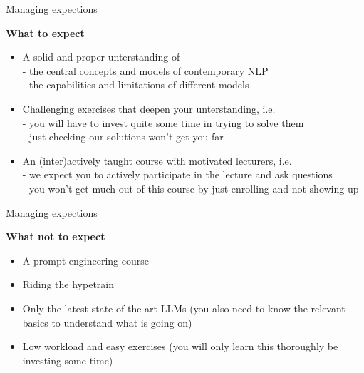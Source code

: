 \begin{vbframe}{Managing expections}

\vfill

\textbf{What to expect}

	\begin{itemize}
		\item A solid and proper unterstanding of\\
		- the central concepts and models of contemporary NLP\\
		- the capabilities and limitations of different models
		\item Challenging exercises that deepen your unterstanding, i.e.\\
		- you will have to invest quite some time in trying to solve them\\
		- just checking our solutions won't get you far
		\item An (inter)actively taught course with motivated lecturers, i.e.\\
		- we expect you to actively participate in the lecture and ask questions\\
		- you won't get much out of this course by just enrolling and not showing up
	\end{itemize}


\vfill

\end{vbframe}


\begin{vbframe}{Managing expections}

\vfill

\textbf{What not to expect}

	\begin{itemize}
		\item A prompt engineering course
		\item Riding the hypetrain
		\item Only the latest state-of-the-art LLMs (you also need to know the relevant basics to understand what is going on)
		\item Low workload and easy exercises (you will only learn this thoroughly be investing some time)
	\end{itemize}

\vfill

\end{vbframe}


